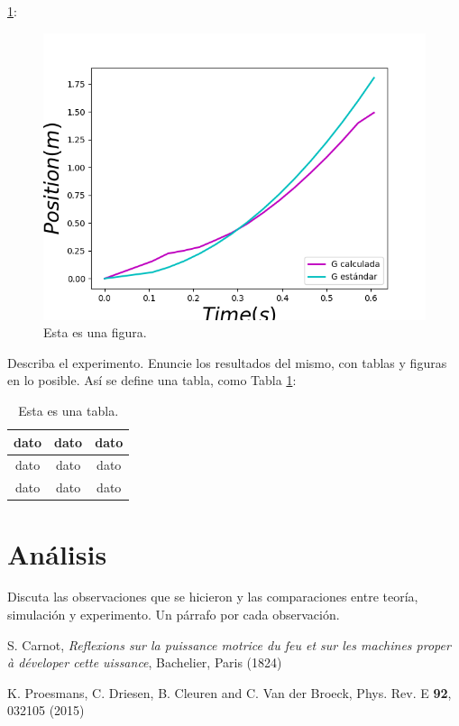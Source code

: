 \documentclass[12pt]{article}
\begin{document}
\ref{graph1}:
\begin{figure}[h]
	\centering
	\includegraphics[scale=0.1]{Grafica.png}
	\caption{Esta es una figura.}
	\label{graph1}
\end{figure}
Describa el experimento. Enuncie los resultados del mismo, con tablas y figuras en lo posible.
Así se define una tabla, como Tabla \ref{table1}:
\begin{table}[h]
	\centering
	\begin{tabular}{|c|c|c|}
		\hline
		dato & dato & dato \\
		\hline
		dato & dato & dato \\
		\hline
		dato & dato & dato \\
		\hline
	\end{tabular}
	\caption{Esta es una tabla.}
	\label{table1}
\end{table}
\section{Análisis}
Discuta las observaciones que se hicieron y las comparaciones entre teoría, simulación y experimento. Un párrafo por cada observación.

\begin{thebibliography}{}

  S. Carnot, {\it Reflexions sur la puissance motrice du feu et sur les machines proper \`a d\'eveloper cette uissance}, Bachelier, Paris (1824)

  K. Proesmans, C. Driesen, B. Cleuren and C. Van der Broeck, Phys. Rev. E {\bf 92}, 032105 (2015)
    
\end{thebibliography}
\end{document}
